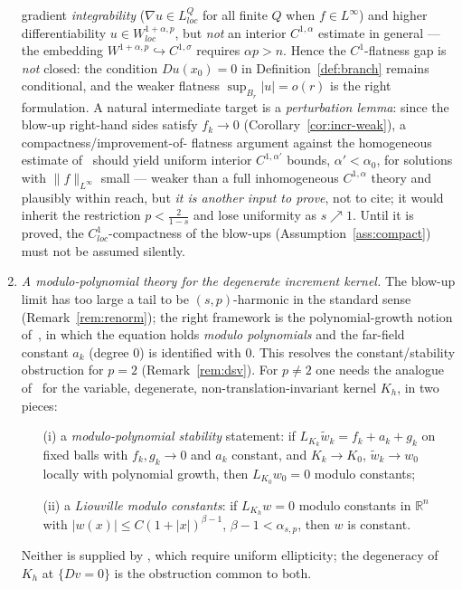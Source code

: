 \documentclass[11pt]{amsart}
\theoremstyle{plain}
\theoremstyle{definition}
\theoremstyle{remark}
\newcommand{\R}{\mathbb{R}}
\newcommand{\al}{\alpha}
\newcommand{\asp}{\alpha_{s,p}}
\begin{document}
\begin{enumerate}[leftmargin=2em]
gradient \emph{integrability} ($\nabla u\in L^Q_{loc}$ for all finite $Q$ when
$f\in L^\infty$) and higher differentiability $u\in W^{1+\al,p}_{loc}$, but
\emph{not} an interior $C^{1,\al}$ estimate in general --- the embedding
$W^{1+\al,p}\hookrightarrow C^{1,\sigma}$ requires $\al p>n$. Hence the
$C^1$-flatness gap is \emph{not} closed: the condition $Du(x_0)=0$ in
Definition~\ref{def:branch} remains conditional, and the weaker flatness
$\sup_{B_r}|u|=o(r)$ is the right formulation. A natural intermediate target
is a \emph{perturbation lemma}: since the blow-up right-hand sides satisfy
$f_k\to0$ (Corollary~\ref{cor:incr-weak}), a compactness/improvement-of-
flatness argument against the homogeneous estimate of~\cite{GJS} should yield
uniform interior $C^{1,\al'}$ bounds, $\al'<\al_0$, for solutions with
$\|f\|_{L^\infty}$ small --- weaker than a full inhomogeneous $C^{1,\al}$
theory and plausibly within reach, but \emph{it is another input to prove},
not to cite; it would inherit the restriction $p<\frac{2}{1-s}$ and lose
uniformity as $s\nearrow1$. Until it is proved, the $C^1_{loc}$-compactness
of the blow-ups (Assumption~\ref{ass:compact}) must not be assumed silently.
\item \emph{A modulo-polynomial theory for the degenerate increment kernel.}
The blow-up limit has too large a tail to be $(s,p)$-harmonic in the standard
sense (Remark~\ref{rem:renorm}); the right framework is the polynomial-growth
notion of~\cite{DSV}, in which the equation holds \emph{modulo polynomials} and
the far-field constant $a_k$ (degree $0$) is identified with $0$. This resolves
the constant/stability obstruction for $p=2$ (Remark~\ref{rem:dsv}). For
$p\neq2$ one needs the analogue of~\cite{DSV} for the variable, degenerate,
non-translation-invariant kernel $K_h$, in two pieces:
\begin{itemize}[leftmargin=2.2em]
\item[(i)] a \emph{modulo-polynomial stability} statement: if
  $L_{K_k}\tilde w_k=f_k+a_k+g_k$ on fixed balls with $f_k,g_k\to0$ and $a_k$
  constant, and $K_k\to K_0$, $\tilde w_k\to w_0$ locally with polynomial
  growth, then $L_{K_0}w_0=0$ modulo constants;
\item[(ii)] a \emph{Liouville modulo constants}: if $L_{K_h}w=0$ modulo
  constants in $\R^n$ with $|w(x)|\le C(1+|x|)^{\beta-1}$, $\beta-1<\asp$, then
  $w$ is constant.
\end{itemize}
Neither is supplied by \cite{DSV,FRO,Serra}, which require uniform ellipticity;
the degeneracy of $K_h$ at $\{Dv=0\}$ is the obstruction common to both.
\end{enumerate}
\end{document}
